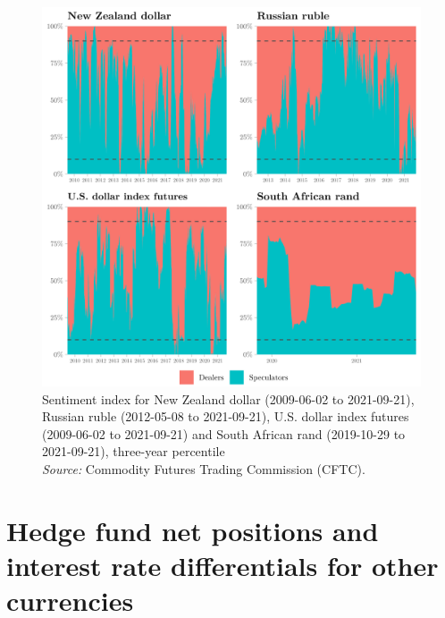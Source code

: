 \documentclass[a4paper, twoside]{templates/ociamthesis}
\begin{document}
\begin{figure}[!ht]

{\centering \includegraphics[width=0.99\columnwidth]{figure/OTHERCUR_2} 

}

\caption[Sentiment index for New Zealand dollar (2009-06-02 to 2021-09-21), Russian ruble (2012-05-08 to 2021-09-21), U.S. dollar index futures (2009-06-02 to 2021-09-21) and South African rand (2019-10-29 to 2021-09-21), three-year percentile]{Sentiment index for New Zealand dollar (2009-06-02 to 2021-09-21), Russian ruble (2012-05-08 to 2021-09-21), U.S. dollar index futures (2009-06-02 to 2021-09-21) and South African rand (2019-10-29 to 2021-09-21), three-year percentile \\ \scriptsize \textit{Source:} Commodity Futures Trading Commission (CFTC).}\label{fig:FigureA37}
\end{figure}

\clearpage

\hypertarget{appendixa5}{%
\section{Hedge fund net positions and interest rate differentials for other currencies}\label{appendixa5}}
\end{document}
